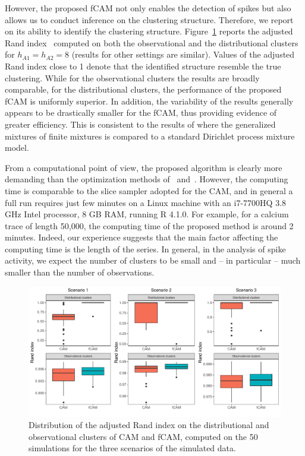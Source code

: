 However, the proposed fCAM not only enables the detection of spikes but also allows us to conduct inference on the clustering structure. Therefore, we report on its ability to identify the clustering structure. Figure~\ref{fig:rand_index} reports the adjusted Rand index~\parencite{rand1971,hubert1985} computed on both the observational and the distributional clusters for $h_{A1} = h_{A2} = 8$ (results for other settings are similar). Values of the adjusted Rand index close to 1 denote that the identified structure resemble the true clustering. While for the observational clusters the results are broadly comparable, for the distributional clusters, the performance of the proposed fCAM is uniformly superior. In addition, the variability of the results generally appears to be drastically smaller for the fCAM, thus providing evidence of greater efficiency. This is consistent to the results of \textcite{fruhwirthschnatter2020} where  the generalized mixtures of finite mixtures is compared to a standard Dirichlet process mixture model. 

From a computational point of view, the proposed algorithm is clearly more demanding than the optimization methods of~\textcite{jewell2019} and~\textcite{friedrich2017}.  However, the computing time is comparable to the slice sampler adopted for the CAM, and in general a full run requires just few minutes on a Linux machine with an i7-7700HQ 3.8 GHz Intel processor, 8 GB RAM, running R 4.1.0. For example, for a calcium trace of length 50,000, the computing time of the proposed method is around 2 minutes. Indeed, our experience suggests that the main factor affecting the computing time is the length of the series.  In general, in the analysis of spike activity, we expect the number of clusters  to be small and -- in particular -- much smaller than the number of observations.


\begin{figure}
	\centerline{\includegraphics[width = \textwidth]{_Images/ch3_rand_index.pdf}}
	\caption[Comparison between the adjusted Rand index of the fCAM and CAM.]{Distribution of the adjusted Rand index on the distributional and observational clusters of CAM and fCAM, computed on the 50 simulations for the three scenarios of the simulated data.}
	\label{fig:rand_index}
\end{figure}



